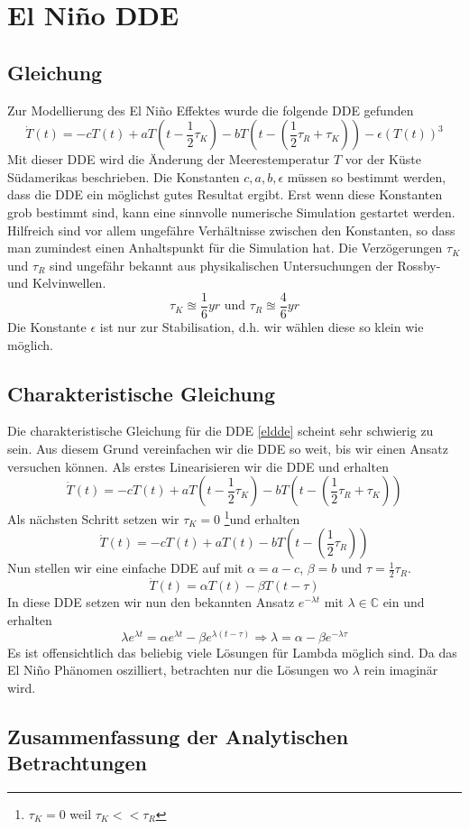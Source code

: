 \section{El Niño DDE}


\subsection{Gleichung}
Zur Modellierung des El Niño Effektes wurde die folgende DDE gefunden %
\begin{equation} \label{eldde}
\dot{T}(t)=-cT(t)+aT(t-\frac{1}{2}\tau_K)-bT(t-(\frac{1}{2}\tau_R+\tau_K))-\epsilon(T(t))^3
\end{equation}
Mit dieser DDE wird die Änderung der Meerestemperatur $T$ vor der Küste Südamerikas beschrieben.
Die Konstanten $c,a,b,\epsilon$ müssen so bestimmt werden, dass die DDE ein möglichst gutes Resultat ergibt.
Erst wenn diese Konstanten grob bestimmt sind, kann eine sinnvolle numerische Simulation gestartet werden.
Hilfreich sind vor allem ungefähre Verhältnisse zwischen den Konstanten, so dass man zumindest einen Anhaltspunkt für die Simulation hat.
Die Verzögerungen $\tau_K$ und $\tau_R$ sind ungefähr bekannt aus physikalischen Untersuchungen der Rossby- und Kelvinwellen.
\begin{equation}
	\tau_K \approxeq \frac{1}{6}yr \text{ und } \tau_R \approxeq \frac{4}{6}yr
\end{equation}
Die Konstante $\epsilon$ ist nur zur Stabilisation, d.h. wir wählen diese so klein wie möglich.


\subsection{Charakteristische Gleichung}
Die charakteristische Gleichung für die DDE \ref{eldde} scheint sehr schwierig zu sein. 
Aus diesem Grund vereinfachen wir die DDE so weit, bis wir einen Ansatz versuchen können.
Als erstes Linearisieren wir die DDE und erhalten
\begin{equation}
	\dot{T}(t)=-cT(t)+aT(t-\frac{1}{2}\tau_K)-bT(t-(\frac{1}{2}\tau_R+\tau_K))
\end{equation}
Als nächsten Schritt setzen wir $\tau_K=0$ \footnote{$\tau_K=0$ weil $\tau_K << \tau_R$}und erhalten
\begin{equation}
	\dot{T}(t)=-cT(t)+aT(t)-bT(t-(\frac{1}{2}\tau_R))
\end{equation}
Nun stellen wir eine einfache DDE auf mit $\alpha = a-c$, $\beta = b$ und $\tau = \frac{1}{2}\tau_R$.
\begin{equation}
	\dot{T}(t)=\alpha T(t)-\beta T(t-\tau)
\end{equation}
In diese DDE setzen wir nun den bekannten Ansatz $e^{-\lambda t}$ mit $\lambda \in \mathbb{C}$ ein und erhalten
\begin{equation}
	\lambda e^{\lambda t} = \alpha e^{\lambda t} - \beta e^{\lambda(t-\tau)} \Longrightarrow \lambda = \alpha-\beta e^{-\lambda \tau}
\end{equation}
Es ist offensichtlich das beliebig viele Lösungen für Lambda möglich sind.
Da das El Niño Phänomen oszilliert, betrachten nur die Lösungen wo $\lambda$ rein imaginär wird. 

\subsection{Zusammenfassung der Analytischen Betrachtungen}